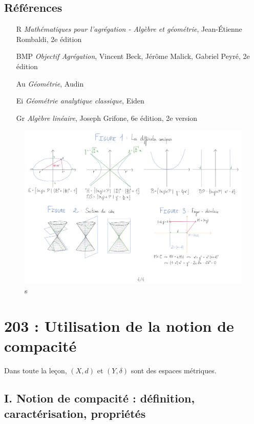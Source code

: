 \documentclass[10pt, a4paper, parskip=full, twoside, twocolumn]{report}
\begin{document}
\section*{Références}
\begin{itemize}
	\item[R] \emph{Mathématiques pour l'agrégation - Algèbre et géométrie}, Jean-Étienne Rombaldi, 2e édition
	\item[BMP] \emph{Objectif Agrégation}, Vincent Beck, Jérôme Malick, Gabriel Peyré, 2e édition
	\item[Au] \emph{Géométrie}, Audin
	\item[Ei] \emph{Géométrie analytique classique}, Eiden
	\item[Gr] \emph{Algèbre linéaire}, Joseph Grifone, 6e édition, 2e version
\end{itemize}

\begin{figure}[!htb]
	\centering
	\includegraphics[trim={0 0 0 0},clip,width=1\linewidth]{img/171.pdf}
	\caption{s}
\end{figure}


\chapter*{203 : Utilisation de la notion de compacité}
\setcounter{definition}{0}

\textcolor{paragraphtext}{Dans toute la leçon, $(X,d)$ et $(Y,\delta)$ sont des espaces métriques.}
\section*{I. Notion de compacité : définition, caractérisation, propriétés}
\end{document}
